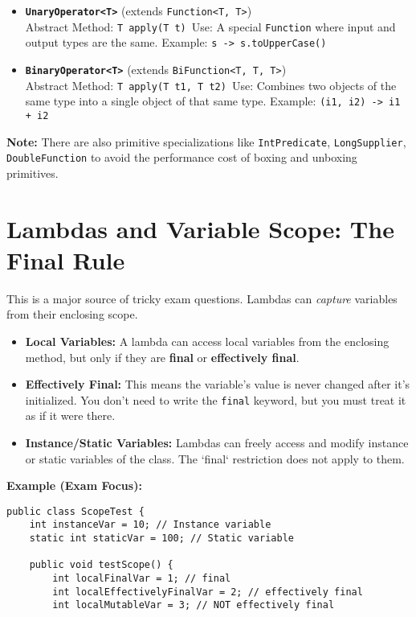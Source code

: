 \documentclass[12pt]{article}
\begin{document}
\begin{enumerate}[label=(\arabic*)]
\begin{itemize}
    \item \texttt{\textbf{UnaryOperator<T>}} (extends \texttt{Function<T, T>}) \\
    Abstract Method: \texttt{T apply(T t)}\
    Use: A special \texttt{Function} where input and output types are the same. Example: \texttt{s -> s.toUpperCase()}

    \item \texttt{\textbf{BinaryOperator<T>}} (extends \texttt{BiFunction<T, T, T>}) \\
    Abstract Method: \texttt{T apply(T t1, T t2)}\
    Use: Combines two objects of the same type into a single object of that same type. Example: \texttt{(i1, i2) -> i1 + i2}
\end{itemize}
\textbf{Note:} There are also primitive specializations like \texttt{IntPredicate}, \texttt{LongSupplier}, \texttt{DoubleFunction} to avoid the performance cost of boxing and unboxing primitives.

\section{Lambdas and Variable Scope: The Final Rule}
This is a major source of tricky exam questions. Lambdas can \textit{capture} variables from their enclosing scope. 

\begin{itemize}
    \item \textbf{Local Variables:} A lambda can access local variables from the enclosing method, but only if they are \textbf{final} or \textbf{effectively final}.
    \item \textbf{Effectively Final:} This means the variable's value is never changed after it's initialized. You don't need to write the \texttt{final} keyword, but you must treat it as if it were there.
    \item \textbf{Instance/Static Variables:} Lambdas can freely access and modify instance or static variables of the class. The `final` restriction does not apply to them.
\end{itemize}

\textbf{Example (Exam Focus):}
\begin{verbatim}
public class ScopeTest {
    int instanceVar = 10; // Instance variable
    static int staticVar = 100; // Static variable

    public void testScope() {
        int localFinalVar = 1; // final
        int localEffectivelyFinalVar = 2; // effectively final
        int localMutableVar = 3; // NOT effectively final


\end{verbatim}
\end{enumerate}
\end{document}
